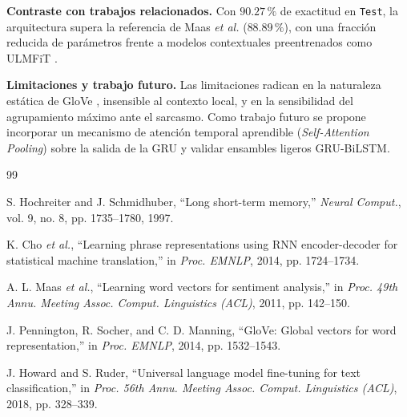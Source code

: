 \documentclass[letterpaper, 10 pt, conference]{ieeeconf}
\begin{document}
\textbf{Contraste con trabajos relacionados.}
Con $90.27\,\%$ de exactitud en \texttt{Test}, la arquitectura supera la referencia de Maas \textit{et al.} \cite{c3} ($88.89\,\%$), con una fracción reducida de parámetros frente a modelos contextuales preentrenados como ULMFiT \cite{c5}.

\textbf{Limitaciones y trabajo futuro.}
Las limitaciones radican en la naturaleza estática de GloVe \cite{c4}, insensible al contexto local, y en la sensibilidad del agrupamiento máximo ante el sarcasmo. Como trabajo futuro se propone incorporar un mecanismo de atención temporal aprendible (\textit{Self-Attention Pooling}) sobre la salida de la GRU y validar ensambles ligeros GRU-BiLSTM.

\begin{thebibliography}{99}
\setlength{\itemsep}{0.2pt}
\setlength{\parskip}{0pt}

 S. Hochreiter and J. Schmidhuber, ``Long short-term memory,'' \textit{Neural Comput.}, vol. 9, no. 8, pp. 1735--1780, 1997.

 K. Cho \textit{et al.}, ``Learning phrase representations using RNN encoder-decoder for statistical machine translation,'' in \textit{Proc. EMNLP}, 2014, pp. 1724--1734.

 A. L. Maas \textit{et al.}, ``Learning word vectors for sentiment analysis,'' in \textit{Proc. 49th Annu. Meeting Assoc. Comput. Linguistics (ACL)}, 2011, pp. 142--150.

 J. Pennington, R. Socher, and C. D. Manning, ``GloVe: Global vectors for word representation,'' in \textit{Proc. EMNLP}, 2014, pp. 1532--1543.

 J. Howard and S. Ruder, ``Universal language model fine-tuning for text classification,'' in \textit{Proc. 56th Annu. Meeting Assoc. Comput. Linguistics (ACL)}, 2018, pp. 328--339.

\end{thebibliography}
\end{document}
